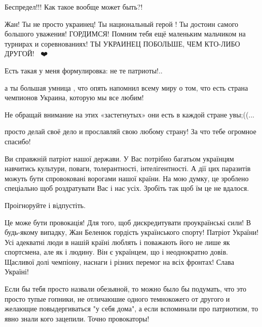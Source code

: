 \begin{itemize}
Беспредел!!! Как такое вообще может быть?!

Жан! Ты не просто украинец! Ты национальный герой ! Ты достоин самого большого
уважения! ГОРДИМСЯ! Помним тебя ещё маленьким мальчиком на турнирах и
соревнованиях! ТЫ УКРАИНЕЦ ПОБОЛЬШЕ, ЧЕМ КТО-ЛИБО ДРУГОЙ! 🙏💪❤️


Есть такая у меня формулировка: не те патриоты!..

а ты большая умница , что опять напомнил всему миру о том, что есть страна
чемпионов Украина, которую мы все любим!

Не обращай внимание на этих «застегнутых» они есть в каждой стране увы;((...

просто делай своё дело и прославляй свою любому страну! За что тебе огромное
спасибо!

 
Ви справжній патріот нашої держави. У Вас потрібно багатьом українцям навчитись
культури, поваги, толерантності, інтелігентності. А дії цих паразитів
можуть бути спровоковані ворогами нашої країни. На мою думку, це зроблено
спеціально щоб роздратувати Вас і нас усіх. Зробіть так щоб їм це не вдалося.

Проігноруйте і відпустіть.

 
Це може бути провокація! Для того, щоб дискредитувати проукраїнські сили! В
будь-якому випадку, Жан Беленюк гордість українського спорту! Патріот України!
Усі адекватні люди в нашій країні люблять і поважають його не лише як
спортсмена, але як і людину. Він є українцем, що і неоднократно довів. Щасливої
долі чемпіону, наснаги і різних перемог на всіх фронтах! Слава Україні!


Если бы тебя просто назвали обезьяной, то можно было бы подумать, что это
просто тупые гопники, не отличаюшие одного темнокожего от другого и желающие
повыдергиваться "у себя дома", а если вспоминали про патриотизм, то явно знали
кого зацепили. Точно провокаторы!


\end{itemize}
